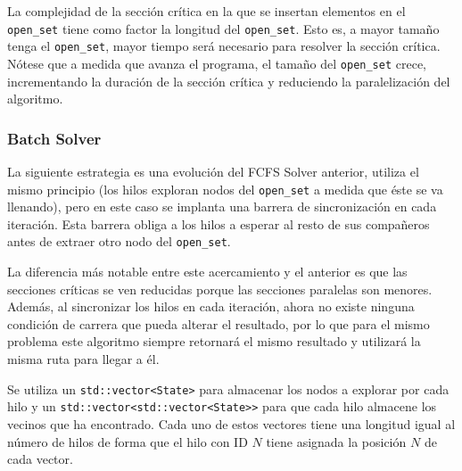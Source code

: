 \begin{notebox}
    La complejidad de la sección crítica en la que se insertan
    elementos en el \lstinline{open_set}
    tiene como factor la longitud del \lstinline{open_set}. 
    Esto es, a mayor tamaño tenga el \lstinline{open_set},
    mayor tiempo será necesario para resolver la sección crítica.\\

    Nótese que a medida que avanza el programa,
    el tamaño del \lstinline{open_set} crece,
    incrementando la duración de la sección crítica y
    reduciendo la paralelización del algoritmo. 
\end{notebox}

\subsubsection{Batch Solver}

La siguiente estrategia es una evolución del FCFS Solver anterior,
utiliza el mismo principio (los hilos exploran nodos del \lstinline{open_set}
a medida que éste se va llenando),
pero en este caso se implanta una barrera de sincronización en cada iteración.
Esta barrera obliga a los hilos a esperar al resto de sus compañeros
antes de extraer otro nodo del \lstinline{open_set}.

La diferencia más notable entre este acercamiento y el anterior es que
las secciones críticas se ven reducidas porque las secciones paralelas
son menores.
Además, al sincronizar los hilos en cada iteración, ahora no existe ninguna
condición de carrera que pueda alterar el resultado, por lo que
para el mismo problema este algoritmo siempre retornará el mismo resultado
y utilizará la misma ruta para llegar a él.

Se utiliza un \lstinline{std::vector<State>} para almacenar los nodos
a explorar por cada hilo y un \lstinline{std::vector<std::vector<State>>}
para que cada hilo almacene los vecinos que ha encontrado.
Cada uno de estos vectores tiene una longitud igual al número de hilos
de forma que el hilo con ID $N$ tiene asignada la posición $N$ de cada
vector.

